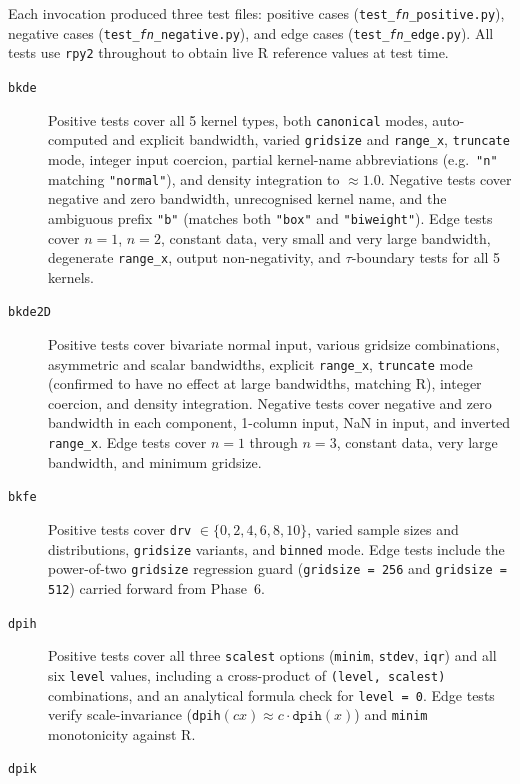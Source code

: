 \documentclass[12pt,a4paper]{article}
\begin{document}
Each invocation produced three test files: positive cases (\texttt{test\_\textit{fn}\_positive.py}), negative cases (\texttt{test\_\textit{fn}\_negative.py}), and edge cases (\texttt{test\_\textit{fn}\_edge.py}). All tests use \texttt{rpy2} throughout to obtain live R reference values at test time.

\begin{description}
  \item[\texttt{bkde}]
    Positive tests cover all 5 kernel types, both \texttt{canonical} modes, auto-computed and explicit bandwidth, varied \texttt{gridsize} and \texttt{range\_x}, \texttt{truncate} mode, integer input coercion, partial kernel-name abbreviations (e.g.\ \texttt{"n"} matching \texttt{"normal"}), and density integration to $\approx 1.0$. Negative tests cover negative and zero bandwidth, unrecognised kernel name, and the ambiguous prefix \texttt{"b"} (matches both \texttt{"box"} and \texttt{"biweight"}). Edge tests cover $n=1$, $n=2$, constant data, very small and very large bandwidth, degenerate \texttt{range\_x}, output non-negativity, and $\tau$-boundary tests for all 5 kernels.
  \item[\texttt{bkde2D}]
    Positive tests cover bivariate normal input, various gridsize combinations, asymmetric and scalar bandwidths, explicit \texttt{range\_x}, \texttt{truncate} mode (confirmed to have no effect at large bandwidths, matching R), integer coercion, and density integration. Negative tests cover negative and zero bandwidth in each component, 1-column input, NaN in input, and inverted \texttt{range\_x}. Edge tests cover $n = 1$ through $n = 3$, constant data, very large bandwidth, and minimum gridsize.
  \item[\texttt{bkfe}]
    Positive tests cover \texttt{drv} $\in \{0, 2, 4, 6, 8, 10\}$, varied sample sizes and distributions, \texttt{gridsize} variants, and \texttt{binned} mode. Edge tests include the power-of-two \texttt{gridsize} regression guard (\texttt{gridsize = 256} and \texttt{gridsize = 512}) carried forward from Phase~6.
  \item[\texttt{dpih}]
    Positive tests cover all three \texttt{scalest} options (\texttt{minim}, \texttt{stdev}, \texttt{iqr}) and all six \texttt{level} values, including a cross-product of \texttt{(level, scalest)} combinations, and an analytical formula check for \texttt{level = 0}. Edge tests verify scale-invariance (\texttt{dpih}$(cx) \approx c \cdot \texttt{dpih}(x)$) and \texttt{minim} monotonicity against R.
  \item[\texttt{dpik}]

\end{description}
\end{document}
